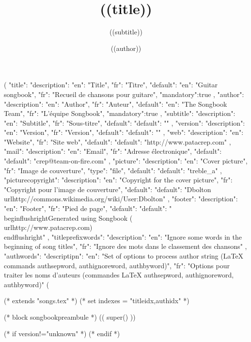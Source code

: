 (%
{
"title": {"description": {"en": "Title", "fr": "Titre"},
            "default": {"en": "Guitar songbook", "fr": "Recueil de chansons pour guitare"},
            "mandatory":true
         },
"author": {"description": {"en": "Author", "fr": "Auteur"},
            "default": {"en": "The Songbook Team", "fr": "L'équipe Songbook"},
            "mandatory":true
         },
"subtitle": {"description": {"en": "Subtitle", "fr": "Sous-titre"},
            "default": {"default": ""}
            },
"version":{ "description": {"en": "Version", "fr": "Version"},
            "default": {"default": ""}
         },
"web": {"description": {"en": "Website", "fr": "Site web"},
         "default": {"default": "http://www.patacrep.com"}
      },
"mail": {"description": {"en": "Email", "fr": "Adresse électronique"},
         "default": {"default": "crep@team-on-fire.com"}
      },
"picture": {"description": {"en": "Cover picture", "fr": "Image de couverture"},
            "type": "file",
            "default": {"default": "treble_a"}
         },
"picturecopyright": {"description": {"en": "Copyright for the cover picture", "fr": "Copyright pour l'image de couverture"},
                     "default": {"default": "Dbolton \\url{http://commons.wikimedia.org/wiki/User:Dbolton}"}
                  },
"footer": {"description": {"en": "Footer", "fr": "Pied de page"},
           "default": {"default": "\\begin{flushright}Generated using Songbook (\\url{http://www.patacrep.com})\\end{flushright}"}
        },
"titleprefixwords": {"description": {"en": "Ignore some words in the beginning of song titles",
                                     "fr": "Ignore des mots dans le classement des chansons"}
                     },
"authwords": {"descriptipn": {"en": "Set of options to process author string (LaTeX commands authsepword, authignoreword, authbyword)",
                              "fr": "Options pour traiter les noms d'auteurs (commandes LaTeX authsepword, authignoreword, authbyword)"}
               }
}
(%

(* extends "songs.tex" *)
(* set indexes = "titleidx,authidx" *)

(* block songbookpreambule *)
   (( super() ))

  \usepackage{chords}

   \title{((title))}
   \author{((author))}
   \subtitle{((subtitle))}
   (* if version!="unknown" *)
   (* endif *)

